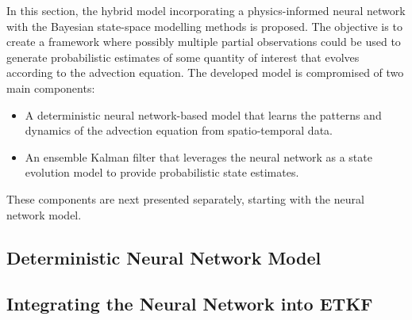 In this section, the hybrid model incorporating a physics-informed neural network with the Bayesian state-space modelling methods is proposed.
The objective is to create a framework where possibly multiple partial observations could be used to generate probabilistic estimates of some quantity of interest that evolves according to the advection equation.
The developed model is compromised of two main components: 
\begin{itemize}
    \item
        A deterministic neural network-based model that learns the patterns and dynamics of the advection equation from spatio-temporal data.
    \item
        An ensemble Kalman filter that leverages the neural network as a state evolution model to provide probabilistic state estimates.
\end{itemize}
These components are next presented separately, starting with the neural network model.

\subsection{Deterministic Neural Network Model\label{subsec:nnmodel}}

\subsection{Integrating the Neural Network into ETKF\label{subsec:etkfmodel}}

